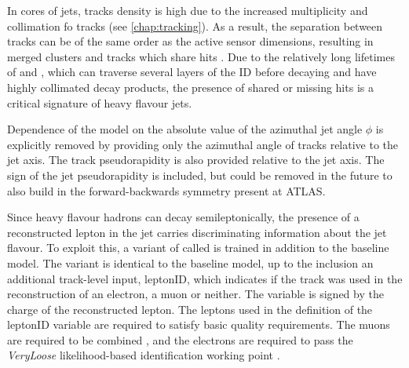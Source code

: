 In cores of \highpt jets, tracks density is high due to the increased multiplicity and collimation fo tracks (see \cref{chap:tracking}).
As a result, the separation between tracks can be of the same order as the active sensor dimensions, resulting in merged clusters and tracks which share hits \cite{PERF-2015-08}.
Due to the relatively long lifetimes of \bhadrons and \chadrons, which can traverse several layers of the ID before decaying and have highly collimated decay products, the presence of shared or missing hits is a critical signature of heavy flavour jets.

Dependence of the model on the absolute value of the azimuthal jet angle $\phi$ is explicitly removed by providing only the azimuthal angle of tracks relative to the jet axis. The track pseudorapidity is also provided relative to the jet axis.
The sign of the jet pseudorapidity is included, but could be removed in the future to also build in the forward-backwards symmetry present at ATLAS.

Since heavy flavour hadrons can decay semileptonically, the presence of a reconstructed lepton in the jet carries discriminating information about the jet flavour.
To exploit this, a variant of \GNN called \GNNLep is trained in addition to the baseline model.
The \GNNLep variant is identical to the baseline model, up to the inclusion an additional track-level input, leptonID, which indicates if the track was used in the reconstruction of an electron, a muon or neither. 
The variable is signed by the charge of the reconstructed lepton.
The leptons used in the definition of the leptonID variable are required to satisfy basic quality requirements.
The muons are required to be combined \cite{ATL-PHYS-PUB-2015-037}, and the electrons are required to pass the \textit{VeryLoose} likelihood-based identification working point \cite{PERF-2017-01}.

